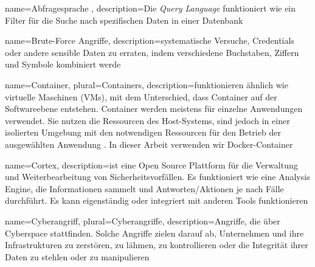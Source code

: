  {
    name={Abfragesprache },
    description={Die \textit{Query Language} funktioniert wie ein Filter für die Suche nach spezifischen Daten in einer Datenbank \citep{at_query}}}




 {
    name={Brute-Force Angriffe},
    description={systematische Versuche, Credentials oder andere sensible Daten zu erraten, indem verschiedene Buchstaben, Ziffern und Symbole kombiniert werde \citep{Sowmya_BruteForce}}}


 {
    name={Container},
    plural={Containers},
    description={funktionieren ähnlich wie virtuelle Maschinen (VMs), mit dem Unterschied, dass Container auf der Softwareebene entstehen. Container werden meistens für einzelne Anwendungen verwendet. Sie nutzen die Ressourcen des Host-Systems, sind jedoch in einer isolierten Umgebung mit den notwendigen Ressourcen für den Betrieb der ausgewählten Anwendung \citep{Douglis_Container}. In dieser Arbeit verwenden wir Docker-Container}}

 {
    name={Cortex},
    description={ist eine  Open Source Plattform für die Verwaltung und Weiterbearbeitung von Sicherheitsvorfällen. Es funktioniert wie eine Analysis Engine, die Informationen sammelt und Antworten/Aktionen je nach Fälle durchführt. Es kann eigenständig oder integriert mit anderen Tools  funktionieren \citep{TheHive}}   
}

 {
    name={Cyberangriff},
    plural={Cyberangriffe},
    description={Angriffe, die über Cyberspace stattfinden. Solche Angriffe zielen darauf ab, Unternehmen und ihre Infrastrukturen zu zerstören, zu lähmen, zu kontrollieren oder die Integrität ihrer Daten zu stehlen oder zu manipulieren \citep{NIST_Definitions}}}

